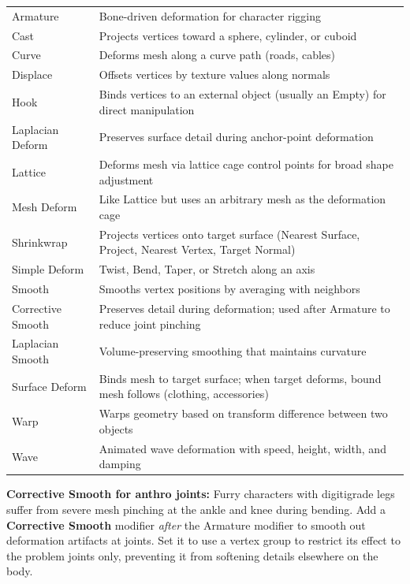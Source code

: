 \begin{center}
\begin{tabularx}{\textwidth}{L{3.5cm}X}
\toprule
{}
 &  \\
\midrule
Armature & Bone-driven deformation for character rigging \\
Cast & Projects vertices toward a sphere, cylinder, or cuboid \\
Curve & Deforms mesh along a curve path (roads, cables) \\
Displace & Offsets vertices by texture values along normals \\
Hook & Binds vertices to an external object (usually an Empty) for direct manipulation \\
Laplacian Deform & Preserves surface detail during anchor-point deformation \\
Lattice & Deforms mesh via lattice cage control points for broad shape adjustment \\
Mesh Deform & Like Lattice but uses an arbitrary mesh as the deformation cage \\
Shrinkwrap & Projects vertices onto target surface (Nearest Surface, Project, Nearest Vertex, Target Normal) \\
Simple Deform & Twist, Bend, Taper, or Stretch along an axis \\
Smooth & Smooths vertex positions by averaging with neighbors \\
Corrective Smooth & Preserves detail during deformation; used after Armature to reduce joint pinching \\
Laplacian Smooth & Volume-preserving smoothing that maintains curvature \\
Surface Deform & Binds mesh to target surface; when target deforms, bound mesh follows (clothing, accessories) \\
Warp & Warps geometry based on transform difference between two objects \\
Wave & Animated wave deformation with speed, height, width, and damping \\
\bottomrule
\end{tabularx}
\end{center}

\begin{furrybox}
\textbf{Corrective Smooth for anthro joints:} Furry characters with digitigrade legs suffer from severe mesh pinching at the ankle and knee during bending. Add a \textbf{Corrective Smooth} modifier \textit{after} the Armature modifier to smooth out deformation artifacts at joints. Set it to use a vertex group to restrict its effect to the problem joints only, preventing it from softening details elsewhere on the body.
\end{furrybox}

